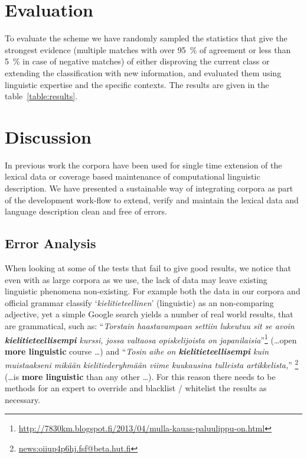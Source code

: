 \documentclass[a5paper]{article}
\begin{document}
\section{Evaluation}

To evaluate the scheme we have randomly sampled the statistics that give the
strongest evidence (multiple matches with over 95~\% of agreement or less than 
5~\% in case of negative matches) of either
disproving the current class or extending the classification with new
information, and evaluated them using linguistic expertise and the specific
contexts. The results are given in the table~\ref{table:results}.

\section{Discussion}

In previous work the corpora have been used for single time extension of the
lexical data or coverage based maintenance of computational linguistic
description. We have presented a sustainable way of integrating corpora
as part of the development work-flow to extend, verify and maintain the lexical
data and language description clean and free of errors.

\subsection{Error Analysis}

When looking at some of the tests that fail to give good results, we notice
that even with as large corpora as we use, the lack of data may leave existing
linguistic phenomena non-existing. For example both the data in our corpora and
official grammar classify `\emph{kielitieteellinen}' (linguistic) as an
non-comparing adjective, yet a simple Google search yields a number of real
world results, that are grammatical, such as: ``\emph{Torstain haastavampaan
    settiin lukeutuu sit se avoin \textbf{kielitieteellisempi} kurssi, jossa
valtaosa opiskelijoista on
japanilaisia}''\footnote{\url{http://7830km.blogspot.fi/2013/04/mulla-kauas-paluulippu-on.html}}
(\ldots open \textbf{more linguistic} course \ldots) and ``\emph{Tosin aihe on
\textbf{kielitieteellisempi} kuin muistaakseni mikään kielitiederyhmään viime
kuukausina tulleista artikkelista,}''
\footnote{\url{news:oiiup4p6hj.fsf@beta.hut.fi}} (\ldots is \textbf{more
linguistic} than any other \ldots). For this reason there needs to be methods
for an expert to override and blacklist / whitelist the results as necessary.
\end{document}
